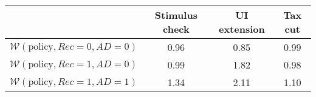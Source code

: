\begin{tabular}{@{}lccc@{}} 
\toprule 
                          & Stimulus check      & UI extension    & Tax cut    \\  \midrule 
$\mathcal{W}(\text{policy}, Rec=0, AD=0)$ & 0.96  & 0.85  & 0.99     \\ 
$\mathcal{W}(\text{policy}, Rec=1, AD=0)$ & 0.99  & 1.82  & 0.98     \\ 
$\mathcal{W}(\text{policy}, Rec=1, AD=1)$ & 1.34  & 2.11  & 1.10     \\ \bottomrule
\end{tabular}  
